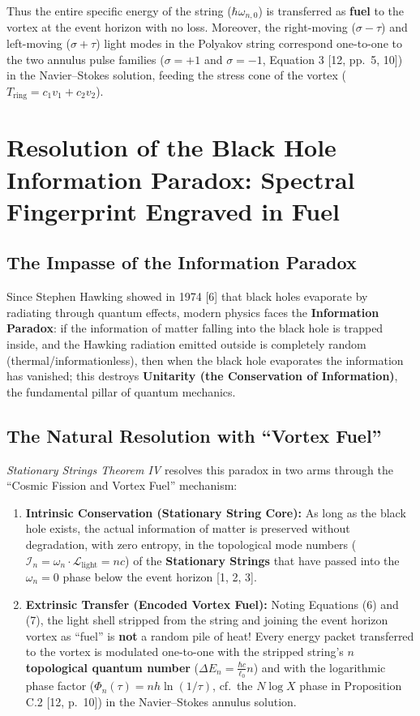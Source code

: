 \documentclass[12pt,a4paper]{article}
\begin{document}
Thus the entire specific energy of the string ($\hbar \omega_{n,0}$) is transferred as \textbf{fuel} to the vortex at the event horizon with no loss. Moreover, the right-moving ($\sigma - \tau$) and left-moving ($\sigma + \tau$) light modes in the Polyakov string correspond one-to-one to the two annulus pulse families ($\sigma = +1$ and $\sigma = -1$, Equation 3 [12, pp.\ 5, 10]) in the Navier--Stokes solution, feeding the stress cone of the vortex ($T_{\text{ring}} = c_1 v_1 + c_2 v_2$).

\section{Resolution of the Black Hole Information Paradox: Spectral Fingerprint Engraved in Fuel}

\subsection{The Impasse of the Information Paradox}

Since Stephen Hawking showed in 1974 [6] that black holes evaporate by radiating through quantum effects, modern physics faces the \textbf{Information Paradox}: if the information of matter falling into the black hole is trapped inside, and the Hawking radiation emitted outside is completely random (thermal/informationless), then when the black hole evaporates the information has vanished; this destroys \textbf{Unitarity (the Conservation of Information)}, the fundamental pillar of quantum mechanics.

\subsection{The Natural Resolution with ``Vortex Fuel''}

\textit{Stationary Strings Theorem IV} resolves this paradox in two arms through the ``Cosmic Fission and Vortex Fuel'' mechanism:

\begin{enumerate}
    \item \textbf{Intrinsic Conservation (Stationary String Core):} As long as the black hole exists, the actual information of matter is preserved without degradation, with zero entropy, in the topological mode numbers ($\mathcal{I}_n = \omega_n \cdot \mathcal{L}_{\text{light}} = n c$) of the \textbf{Stationary Strings} that have passed into the $\omega_n = 0$ phase below the event horizon [1, 2, 3].
    \item \textbf{Extrinsic Transfer (Encoded Vortex Fuel):} Noting Equations (6) and (7), the light shell stripped from the string and joining the event horizon vortex as ``fuel'' is \textbf{not} a random pile of heat! Every energy packet transferred to the vortex is modulated one-to-one with the stripped string's \textbf{$n$ topological quantum number} ($\Delta E_n = \frac{\hbar c}{\ell_0} n$) and with the logarithmic phase factor ($\Phi_n(\tau) = n h \ln(1/\tau)$, cf.\ the $N \log X$ phase in Proposition C.2 [12, p.\ 10]) in the Navier--Stokes annulus solution.
\end{enumerate}
\end{document}
